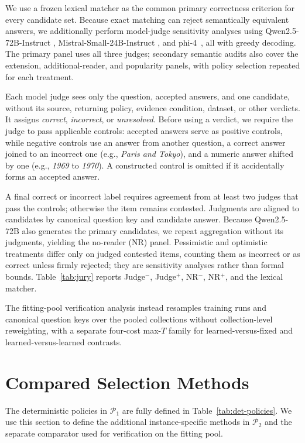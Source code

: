 \documentclass[sigconf]{acmart}
\begin{document}
We use a frozen lexical matcher as the common primary correctness
criterion for every candidate set. Because exact matching can
reject semantically equivalent answers, we additionally perform
model-judge sensitivity analyses using Qwen2.5-72B-Instruct
\cite{qwen2024qwen25}, Mistral-Small-24B-Instruct
\cite{mistral2025small24b}, and phi-4~\cite{microsoft2024phi4}, all with
greedy decoding. The primary panel uses all three judges; secondary
semantic audits also cover the extension, additional-reader, and
popularity panels, with policy selection repeated for each treatment.

Each model judge sees only the question, accepted answers, and one
candidate, without its source, returning policy, evidence condition,
dataset, or other verdicts. It assigns \emph{correct},
\emph{incorrect}, or \emph{unresolved}. Before using a verdict, we
require the judge to pass applicable controls: accepted answers serve
as positive controls, while negative controls use an answer from
another question, a correct answer joined to an incorrect one
(e.g., \emph{Paris and Tokyo}), and a numeric answer shifted by one
(e.g., \emph{1969} to \emph{1970}). A constructed control is omitted
if it accidentally forms an accepted answer.

A final correct or incorrect label requires agreement from at least two
judges that pass the controls; otherwise the item remains contested.
Judgments are aligned to candidates by canonical question key and
candidate answer. Because Qwen2.5-72B also generates the primary
candidates, we repeat aggregation without its judgments, yielding the
no-reader (NR) panel. Pessimistic and optimistic treatments differ only
on judged contested items, counting them as incorrect or as correct
unless firmly rejected; they are sensitivity analyses rather than
formal bounds. Table~\ref{tab:jury} reports Judge$^-$, Judge$^+$,
NR$^-$, NR$^+$, and the lexical matcher.

The fitting-pool verification analysis instead resamples training runs
and canonical question keys over the pooled collections without
collection-level reweighting, with a separate four-cost max-$T$ family
for learned-versus-fixed and learned-versus-learned contrasts.

\section{Compared Selection Methods}
\label{sec:methods}

The deterministic policies in $\mathcal{P}_1$ are fully defined in
Table~\ref{tab:det-policies}. We use this section to define the
additional instance-specific methods in $\mathcal{P}_2$ and the
separate comparator used for verification on the fitting pool.
\end{document}
